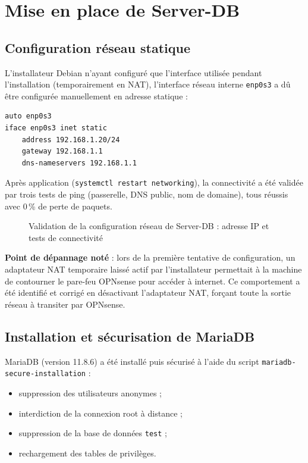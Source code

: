 \section{Mise en place de Server-DB}

\subsection{Configuration réseau statique}

L'installateur Debian n'ayant configuré que l'interface utilisée pendant
l'installation (temporairement en NAT), l'interface réseau interne
\texttt{enp0s3} a dû être configurée manuellement en adresse statique :

\begin{lstlisting}[language=bash, caption={Configuration statique de l'interface réseau}]
auto enp0s3
iface enp0s3 inet static
    address 192.168.1.20/24
    gateway 192.168.1.1
    dns-nameservers 192.168.1.1
\end{lstlisting}

Après application (\texttt{systemctl restart networking}), la connectivité
a été validée par trois tests de ping (passerelle, DNS public, nom de
domaine), tous réussis avec 0\,\% de perte de paquets.

\begin{figure}[h]
\centering
\caption{Validation de la configuration réseau de Server-DB : adresse IP et tests de connectivité}
\label{fig:server-db-network}
\end{figure}

\textbf{Point de dépannage noté} : lors de la première tentative de
configuration, un adaptateur NAT temporaire laissé actif par
l'installateur permettait à la machine de contourner le pare-feu OPNsense
pour accéder à internet. Ce comportement a été identifié et corrigé en
désactivant l'adaptateur NAT, forçant toute la sortie réseau à transiter
par OPNsense.

\subsection{Installation et sécurisation de MariaDB}

MariaDB (version 11.8.6) a été installé puis sécurisé à l'aide du script
\texttt{mariadb-secure-installation} :

\begin{itemize}
    \item suppression des utilisateurs anonymes ;
    \item interdiction de la connexion root à distance ;
    \item suppression de la base de données \texttt{test} ;
    \item rechargement des tables de privilèges.
\end{itemize}

